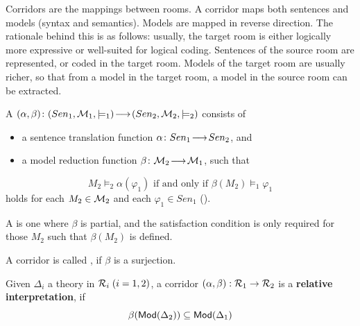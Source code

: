 \documentclass[10pt,%
\ifpretendfinal
final%
\else
draft%
\fi,
]{scrreprt}
\begin{document}
Corridors are the mappings between rooms. A corridor maps both sentences
and models (syntax and semantics). Models are mapped in reverse
direction. The rationale behind this is as follows: usually, the
target room is either logically more expressive or well-suited for
logical coding. Sentences of the source room are represented, or coded
in the target room. Models of the target room are usually richer, so
that from a model in the target room, a model in the source room can
be extracted.
\begin{definition}\label{def:corridor}
A 
$
(\alpha,\beta)\colon(Sen_1,{\cal M}_1,\models_1)\!\longrightarrow\!(Sen_2,{\cal M}_2,\models_2)
$
 consists of
\begin{itemize}
\item a sentence translation function $\alpha\colon Sen_1\!\longrightarrow\!Sen_2$, and
\item a model reduction function
$\beta\colon{\cal M}_2\!\longrightarrow\!{\cal M}_1$, 
such that
\end{itemize}
$$M_2\models_2 \alpha(\varphi_1) \mbox{ if and only if } 
\beta(M_2)\models_1 \varphi_1$$
holds for each $M_2\in {\cal M}_2$ and each $\varphi_1\in Sen_1$
().

A  is one where $\beta$ is partial,
and the satisfaction condition is only required for those $M_2$
such that $\beta(M_2)$ is defined.
\end{definition}
A corridor is called , if $\beta$ is a surjection.

\begin{definition}
  Given $\Delta_i$ a theory in ${\cal R}_i\;(i=1,2)$, a corridor $(\alpha,\beta):{\cal R}_1\to {\cal R}_2$ is a \textbf{relative interpretation}, if
\[
\beta(\mathsf{Mod}(\Delta_2))\subseteq \mathsf{Mod}(\Delta_1)
\]
\end{definition}
\end{document}
